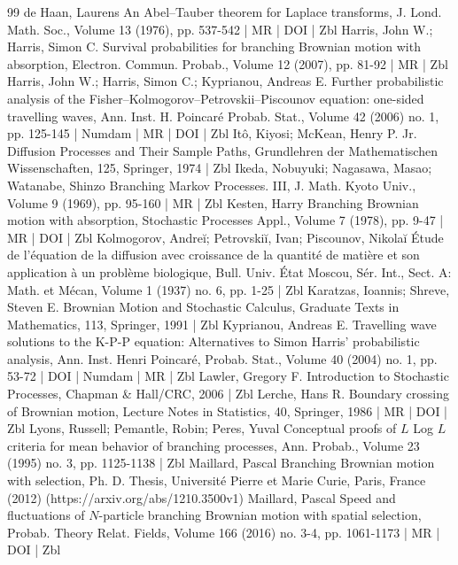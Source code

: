 \documentclass[10pt]{amsart}
\theoremstyle{definition}\newtheorem{defi}[theo]{Definition}\newtheorem{rema}[theo]{Remark}\newtheorem{exam}[theo]{Example}\newtheorem{exem}[theo]{Example}\newtheorem{nota}[theo]{Notation}
\newcommand{\1} {\mathds{1}}
\begin{document}
\begin{thebibliography}{99}
de Haan, Laurens An Abel–Tauber theorem for Laplace transforms, J. Lond. Math. Soc., Volume 13 (1976), pp. 537-542 | MR | DOI | Zbl
Harris, John W.; Harris, Simon C. Survival probabilities for branching Brownian motion with absorption, Electron. Commun. Probab., Volume 12 (2007), pp. 81-92 | MR | Zbl
Harris, John W.; Harris, Simon C.; Kyprianou, Andreas E. Further probabilistic analysis of the Fisher–Kolmogorov–Petrovskii–Piscounov equation: one-sided travelling waves, Ann. Inst. H. Poincaré Probab. Stat., Volume 42 (2006) no. 1, pp. 125-145 | Numdam | MR | DOI | Zbl
Itô, Kiyosi; McKean, Henry P. Jr. Diffusion Processes and Their Sample Paths, Grundlehren der Mathematischen Wissenschaften, 125, Springer, 1974 | Zbl
Ikeda, Nobuyuki; Nagasawa, Masao; Watanabe, Shinzo Branching Markov Processes. III, J. Math. Kyoto Univ., Volume 9 (1969), pp. 95-160 | MR | Zbl
Kesten, Harry Branching Brownian motion with absorption, Stochastic Processes Appl., Volume 7 (1978), pp. 9-47 | MR | DOI | Zbl
Kolmogorov, Andreĭ; Petrovskiĭ, Ivan; Piscounov, Nikolaĭ Étude de l’équation de la diffusion avec croissance de la quantité de matière et son application à un problème biologique, Bull. Univ. État Moscou, Sér. Int., Sect. A: Math. et Mécan, Volume 1 (1937) no. 6, pp. 1-25 | Zbl
Karatzas, Ioannis; Shreve, Steven E. Brownian Motion and Stochastic Calculus, Graduate Texts in Mathematics, 113, Springer, 1991 | Zbl
Kyprianou, Andreas E. Travelling wave solutions to the K-P-P equation: Alternatives to Simon Harris’ probabilistic analysis, Ann. Inst. Henri Poincaré, Probab. Stat., Volume 40 (2004) no. 1, pp. 53-72 | DOI | Numdam | MR | Zbl
Lawler, Gregory F. Introduction to Stochastic Processes, Chapman \& Hall/CRC, 2006 | Zbl
Lerche, Hans R. Boundary crossing of Brownian motion, Lecture Notes in Statistics, 40, Springer, 1986 | MR | DOI | Zbl
Lyons, Russell; Pemantle, Robin; Peres, Yuval Conceptual proofs of ${L}$ Log ${L}$ criteria for mean behavior of branching processes, Ann. Probab., Volume 23 (1995) no. 3, pp. 1125-1138 | Zbl
Maillard, Pascal Branching Brownian motion with selection, Ph. D. Thesis, Université Pierre et Marie Curie, Paris, France (2012) (https://arxiv.org/abs/1210.3500v1)
Maillard, Pascal Speed and fluctuations of ${N}$-particle branching Brownian motion with spatial selection, Probab. Theory Relat. Fields, Volume 166 (2016) no. 3-4, pp. 1061-1173 | MR | DOI | Zbl

\end{thebibliography}
\end{document}
